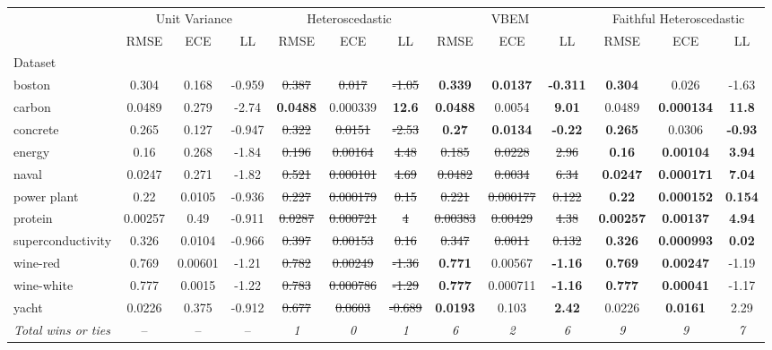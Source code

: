 \begin{tabular}{l|ccc|ccc|ccc|ccc}
\toprule
 & \multicolumn{3}{|c}{Unit Variance} & \multicolumn{3}{|c}{Heteroscedastic} & \multicolumn{3}{|c}{VBEM} & \multicolumn{3}{|c}{Faithful Heteroscedastic} \\
 & RMSE & ECE & LL & RMSE & ECE & LL & RMSE & ECE & LL & RMSE & ECE & LL \\
Dataset &  &  &  &  &  &  &  &  &  &  &  &  \\
\midrule
boston & 0.304 & 0.168 & -0.959 & \sout{0.387} & \sout{0.017} & \sout{-1.05} & \textbf{0.339} & \textbf{0.0137} & \textbf{-0.311} & \textbf{0.304} & 0.026 & -1.63 \\
carbon & 0.0489 & 0.279 & -2.74 & \textbf{0.0488} & 0.000339 & \textbf{12.6} & \textbf{0.0488} & 0.0054 & \textbf{9.01} & 0.0489 & \textbf{0.000134} & \textbf{11.8} \\
concrete & 0.265 & 0.127 & -0.947 & \sout{0.322} & \sout{0.0151} & \sout{-2.53} & \textbf{0.27} & \textbf{0.0134} & \textbf{-0.22} & \textbf{0.265} & 0.0306 & \textbf{-0.93} \\
energy & 0.16 & 0.268 & -1.84 & \sout{0.196} & \sout{0.00164} & \sout{4.48} & \sout{0.185} & \sout{0.0228} & \sout{2.96} & \textbf{0.16} & \textbf{0.00104} & \textbf{3.94} \\
naval & 0.0247 & 0.271 & -1.82 & \sout{0.521} & \sout{0.000101} & \sout{4.69} & \sout{0.0482} & \sout{0.0034} & \sout{6.34} & \textbf{0.0247} & \textbf{0.000171} & \textbf{7.04} \\
power plant & 0.22 & 0.0105 & -0.936 & \sout{0.227} & \sout{0.000179} & \sout{0.15} & \sout{0.221} & \sout{0.000177} & \sout{0.122} & \textbf{0.22} & \textbf{0.000152} & \textbf{0.154} \\
protein & 0.00257 & 0.49 & -0.911 & \sout{0.0287} & \sout{0.000721} & \sout{4} & \sout{0.00383} & \sout{0.00429} & \sout{4.38} & \textbf{0.00257} & \textbf{0.00137} & \textbf{4.94} \\
superconductivity & 0.326 & 0.0104 & -0.966 & \sout{0.397} & \sout{0.00153} & \sout{0.16} & \sout{0.347} & \sout{0.0011} & \sout{0.132} & \textbf{0.326} & \textbf{0.000993} & \textbf{0.02} \\
wine-red & 0.769 & 0.00601 & -1.21 & \sout{0.782} & \sout{0.00249} & \sout{-1.36} & \textbf{0.771} & 0.00567 & \textbf{-1.16} & \textbf{0.769} & \textbf{0.00247} & -1.19 \\
wine-white & 0.777 & 0.0015 & -1.22 & \sout{0.783} & \sout{0.000786} & \sout{-1.29} & \textbf{0.777} & 0.000711 & \textbf{-1.16} & \textbf{0.777} & \textbf{0.00041} & -1.17 \\
yacht & 0.0226 & 0.375 & -0.912 & \sout{0.677} & \sout{0.0603} & \sout{-0.689} & \textbf{0.0193} & 0.103 & \textbf{2.42} & 0.0226 & \textbf{0.0161} & 2.29 \\
\textit{{Total wins or ties}} & -- & -- & -- & \textit{1} & \textit{0} & \textit{1} & \textit{6} & \textit{2} & \textit{6} & \textit{9} & \textit{9} & \textit{7} \\
\bottomrule
\end{tabular}
